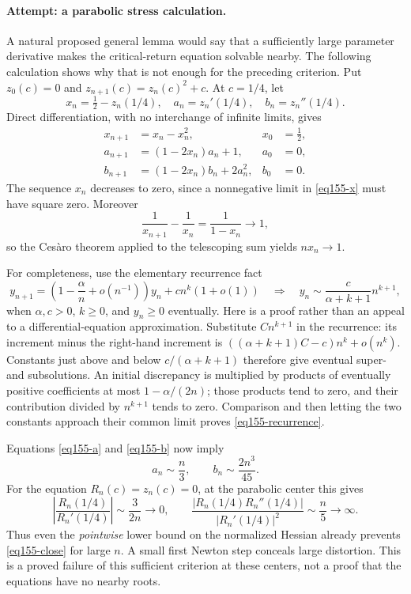 \documentclass[11pt,a4paper]{article}
\numberwithin{equation}{section}
\begin{document}
\paragraph{Attempt: a parabolic stress calculation.}
A natural proposed general lemma would say that a sufficiently large
parameter derivative makes the critical-return equation solvable nearby.
The following calculation shows why that is not enough for the preceding
criterion. Put $z_0(c)=0$ and $z_{n+1}(c)=z_n(c)^2+c$. At $c=1/4$, let
\[
 x_n=\tfrac12-z_n(1/4),\quad
 a_n=z_n'(1/4),\quad b_n=z_n''(1/4).
\]
Direct differentiation, with no interchange of infinite limits, gives
\begin{align}
 x_{n+1}&=x_n-x_n^2, & x_0&=\tfrac12,\label{eq155-x}\\
 a_{n+1}&=(1-2x_n)a_n+1, & a_0&=0,\label{eq155-a}\\
 b_{n+1}&=(1-2x_n)b_n+2a_n^2, & b_0&=0.\label{eq155-b}
\end{align}
The sequence $x_n$ decreases to zero, since a nonnegative limit in
\eqref{eq155-x} must have square zero. Moreover
\[
 \frac1{x_{n+1}}-\frac1{x_n}=\frac1{1-x_n}\longrightarrow1,
\]
so the Ces\`aro theorem applied to the telescoping sum yields $nx_n\to1$.

For completeness, use the elementary recurrence fact
\begin{equation}\label{eq155-recurrence}
 y_{n+1}=\left(1-\frac{\alpha}{n}+o(n^{-1})\right)y_n
       +c n^k(1+o(1))
 \quad\Longrightarrow\quad
 y_n\sim\frac{c}{\alpha+k+1}n^{k+1},
\end{equation}
when $\alpha,c>0$, $k\ge0$, and $y_n\ge0$ eventually. Here is a proof
rather than an appeal to a differential-equation approximation. Substitute
$C n^{k+1}$ in the recurrence: its increment minus the right-hand increment
is $((\alpha+k+1)C-c)n^k+o(n^k)$. Constants just above and below
$c/(\alpha+k+1)$ therefore give eventual super- and subsolutions. An
initial discrepancy is multiplied by products of eventually positive
coefficients at most $1-\alpha/(2n)$; those products tend to zero, and their
contribution divided by $n^{k+1}$ tends to zero. Comparison and then letting
the two constants approach their common limit proves
\eqref{eq155-recurrence}.

Equations \eqref{eq155-a} and \eqref{eq155-b} now imply
\[
 a_n\sim\frac n3,\qquad b_n\sim\frac{2n^3}{45}.
\]
For the equation $R_n(c)=z_n(c)=0$, at the parabolic center this gives
\begin{equation}\label{eq155-failure}
 \left|\frac{R_n(1/4)}{R_n'(1/4)}\right|\sim\frac{3}{2n}
 \longrightarrow0,
 \qquad
 \frac{|R_n(1/4)R_n''(1/4)|}{|R_n'(1/4)|^2}\sim\frac n5
 \longrightarrow\infty.
\end{equation}
Thus even the \emph{pointwise} lower bound on the normalized Hessian
already prevents \eqref{eq155-close} for large $n$. A small first Newton
step conceals large distortion. This is a proved failure of this sufficient
criterion at these centers, not a proof that the equations have no nearby
roots.
\end{document}
